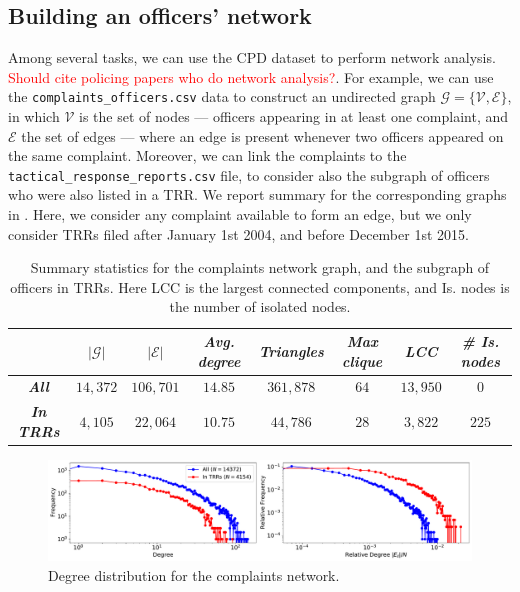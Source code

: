 
\subsection{Building an officers' network}

Among several tasks, we can use the CPD dataset to perform network analysis. \textcolor{red}{Should cite policing papers who do network analysis?}. For example, we can use the \texttt{complaints\_officers.csv} data to construct an undirected graph $\mathcal{G} = \{\mathcal{V}, \mathcal{E}\}$, in which $\mathcal{V}$ is the set of nodes --- officers appearing in at least one complaint, and $\mathcal{E}$ the set of edges --- where an edge is present whenever two officers appeared on the same complaint. Moreover, we can link the complaints to the \texttt{tactical\_response\_reports.csv} file, to consider also the subgraph of officers who were also listed in a TRR. We report summary for the corresponding graphs in . Here, we consider any complaint available to form an edge, but we only consider TRRs filed after January 1st 2004, and before December 1st 2015.

\begin{table}[h]
\begin{tabular}{c|c|c|c|c|c|c|c|}
\cline{2-8}
                                                & $|\mathcal{G}|$ & $|\mathcal{E}|$ & \textit{Avg. degree} & \textit{Triangles} & \textit{Max clique} & \textit{LCC} & \textit{\# Is. nodes} \\ \hline
\multicolumn{1}{|c|}{\textit{\textbf{All}}}     & $14{,}372$      & $106{,}701$     & $14.85$              & $361{,}878$        & $64$                & $13{,}950$   & $0$                   \\ \hline
\multicolumn{1}{|c|}{\textit{\textbf{In TRRs}}} & $4{,}105$       & $22{,}064$      & $10.75$              & $44{,}786$         & $28$                & $3{,}822$    & $225$                 \\ \hline
\end{tabular} \label{tab:stats_graphs}
\caption{Summary statistics for the complaints network graph, and the subgraph of officers in TRRs. Here LCC is the largest connected components, and Is. nodes is the number of isolated nodes.}
\end{table}

\begin{figure}[t!] 
	\includegraphics[width=\textwidth]{figs/degree_distribution} 
	\caption{Degree distribution for the complaints network.}
\label{fig:degree_distribution}
\end{figure}

